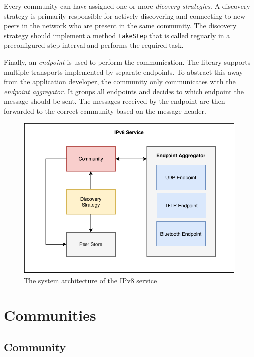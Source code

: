 Every community can have assigned one or more \textit{dicovery strategies}. A discovery strategy is primarily responsible for actively discovering and connecting to new peers in the network who are present in the same community. The discovery strategy should implement a method \texttt{takeStep} that is called reguarly in a preconfigured step interval and performs the required task.

Finally, an \textit{endpoint} is used to perform the communication. The library supports multiple transports implemented by separate endpoints. To abstract this away from the application developer, the community only communicates with the \textit{endpoint aggregator}. It groups all endpoints and decides to which endpoint the message should be sent. The messages received by the endpoint are then forwarded to the correct community based on the message header.

\begin{figure}
    \includegraphics[width=\textwidth]{diagrams/ipv8-architecture}
    \caption{The system architecture of the IPv8 service}
    \label{ipv8_architecture}
\end{figure}

\section{Communities}

\subsection{Community}



